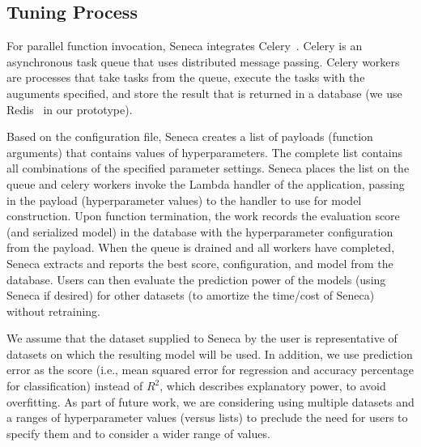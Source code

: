 \subsection{Tuning Process}

For parallel function invocation, Seneca integrates 
Celery~\cite{ref:celery}. Celery is an asynchronous task queue 
that uses distributed message passing. Celery workers are processes 
that take tasks from the queue, execute the tasks with the auguments specified, 
and store the result that is returned 
in a database (we use Redis~\cite{ref:redis} in our prototype). 

Based on the configuration file, Seneca creates a list of 
payloads (function arguments) that contains values of 
hyperparameters.  The complete list contains all combinations of the
specified parameter
settings.  Seneca places the list on the queue and celery 
workers invoke the Lambda handler of the application, passing in the
payload (hyperparameter values) to the handler to use for model construction.  
Upon function
termination, the work records the evaluation score (and serialized model)
in the database with the hyperparameter configuration from the payload.
When the queue is drained and all workers have completed, Seneca
extracts and reports the best score, configuration, and model from the database.
Users can then evaluate the prediction power of the models (using Seneca if desired) 
for other datasets (to amortize the time/cost of Seneca) without retraining. 

We assume that the dataset supplied to Seneca by the user
is representative of datasets on which the 
resulting model will be used.  In addition, we use prediction error as the 
score (i.e., mean squared error for regression and accuracy percentage for classification) 
instead of $R^2$, which describes explanatory power, to avoid overfitting.
As part of future work, we are considering using multiple datasets and a ranges
of hyperparameter values (versus lists) to preclude the need for users to specify
them and to consider a wider range of values.
